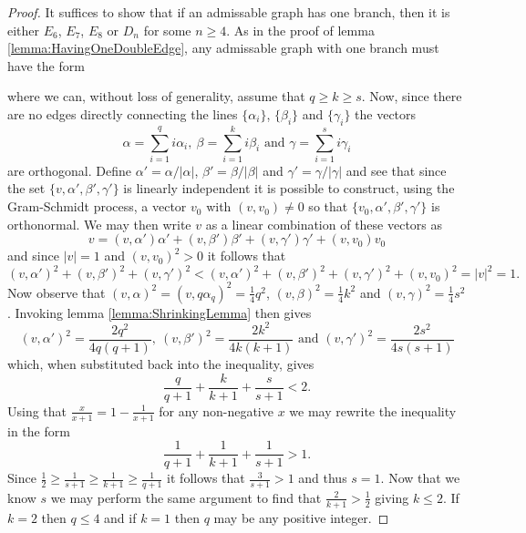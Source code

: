 \documentclass[twoside,utf8]{article}
\theoremstyle{plain}
\theoremstyle{definition}
\theoremstyle{remark}
\begin{document}
\begin{proof}
It suffices to show that if an admissable graph has one branch, then it is either $E_6$, $E_7$, $E_8$ or $D_n$ for some $n\geq 4$. As in the proof of lemma \ref*{lemma:HavingOneDoubleEdge}, any admissable graph with one branch must have the form
\begin{center}
\end{center}
where we can, without loss of generality, assume that $q\geq k \geq s$. Now, since there are no edges directly connecting the lines $\{\alpha_i\}$, $\{\beta_i\}$ and $\{\gamma_i\}$ the vectors
\[
\alpha = \sum_{i=1}^q i\alpha_i, \ \beta = \sum_{i=1}^k i\beta_i \mbox{ and } \gamma = \sum_{i=1}^s i\gamma_i
\]
are orthogonal. Define $\alpha'=\alpha/|\alpha|$, $\beta'=\beta/|\beta|$ and $\gamma'=\gamma/|\gamma|$ and see that since the set $\{ v,\alpha',\beta',\gamma'\}$ is linearly independent it is possible to construct, using the Gram-Schmidt process, a vector $v_0$ with $(v,v_0)\neq 0$ so that $\{ v_0,\alpha',\beta',\gamma'\}$ is orthonormal. We may then write $v$ as a linear combination of these vectors as
\[
v = (v,\alpha')\alpha'+(v,\beta')\beta'+(v,\gamma')\gamma'+(v,v_0)v_0
\]
and since $|v|=1$ and $(v,v_0)^2>0$ it follows that
\[
(v,\alpha')^2+(v,\beta')^2+(v,\gamma')^2< (v,\alpha')^2+(v,\beta')^2+(v,\gamma')^2+(v,v_0)^2 = |v|^2 = 1.
\]
Now observe that $(v,\alpha)^2=(v,q\alpha_q)^2=\frac{1}{4}q^2$, $(v,\beta)^2=\frac{1}{4}k^2$ and $(v,\gamma)^2=\frac{1}{4}s^2$. Invoking lemma \ref*{lemma:ShrinkingLemma} then gives 
\[
(v,\alpha')^2=\frac{2q^2}{4q(q+1)}, \ 
(v,\beta')^2=\frac{2k^2}{4k(k+1)} 
\mbox{ and }
(v,\gamma')^2=\frac{2s^2}{4s(s+1)} 
\]
which, when substituted back into the inequality, gives 
\[
\frac{q}{q+1}+\frac{k}{k+1}+\frac{s}{s+1}<2.
\]
Using that $\frac{x}{x+1}=1-\frac{1}{x+1}$ for any non-negative $x$ we may rewrite the inequality in the form
\[
\frac{1}{q+1}+\frac{1}{k+1}+\frac{1}{s+1}>1.
\]
Since $\frac{1}{2}\geq \frac{1}{s+1} \geq \frac{1}{k+1} \geq \frac{1}{q+1}$ it follows that $\frac{3}{s+1} > 1$ and thus $s=1$. Now that we know $s$ we may perform the same argument to find that $\frac{2}{k+1} > \frac{1}{2}$ giving $k\leq 2$. If $k=2$ then $q\leq 4$ and if $k=1$ then $q$ may be any positive integer.
\end{proof}
\end{document}

